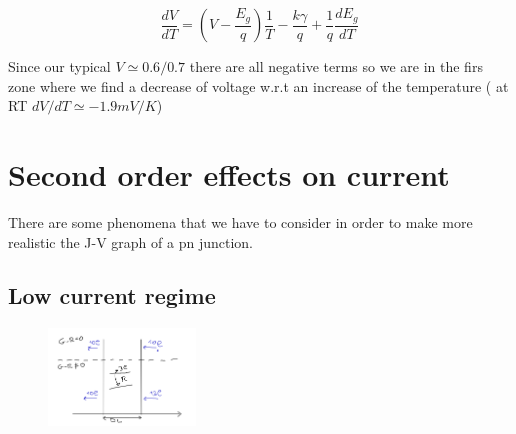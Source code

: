 \begin{equation}
\frac{dV}{dT}=(V-\frac{E_g}{q})\frac{1}{T}-\frac{k\gamma}{q} + \frac{1}{q}\frac{dE_g}{dT}
\end{equation}

Since our typical $V\simeq0.6/0.7$ there are all negative terms so we are in the firs zone where we find a decrease of voltage w.r.t an increase of the temperature ( at RT $dV/dT\simeq -1.9mV/K$)

\section{Second order effects on current}
There are some phenomena that we have to consider in order to make more realistic the J-V graph of a pn junction.
\subsection{Low current regime}

\begin{figure}
\includegraphics[width=0.35\textwidth]{Rdl.png}
\end{figure}

